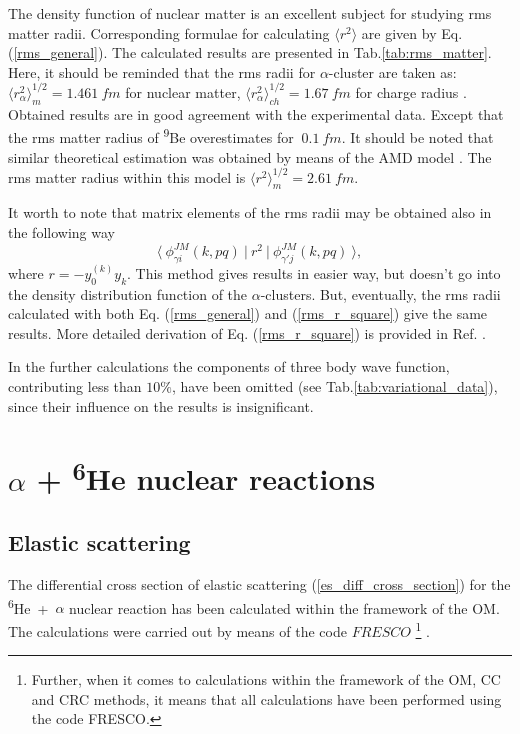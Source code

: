 \documentclass[
12pt, %
oneside, %
english, %
doublespacing, %
doublespacing, %
toctotoc, %
parskip, %
headsepline, %
]{MastersDoctoralThesis} %
\newcommand{\he}{\textsuperscript{6}He\xspace}
\newcommand{\be}{\textsuperscript{9}Be\xspace}
\begin{document}
The density function of nuclear matter is an excellent subject for studying rms matter radii. Corresponding formulae for calculating $\langle r^2 \rangle$ are given by Eq.(\ref{rms_general}).
The calculated results are presented in Tab.\ref{tab:rms_matter}. 
Here, it should be reminded that the rms radii for $\alpha$-cluster are taken as: $\langle r^2_\alpha \rangle^{1/2}_m=1.461~fm$ for nuclear matter, $\langle r^2_\alpha \rangle^{1/2}_{ch}=1.67~fm$ for charge radius \cite{satchler1979folding}.
Obtained results are in good agreement with the experimental data.
Except that the rms matter radius of \be overestimates for $~0.1~fm$. 
It should be noted that similar theoretical estimation was obtained 
by means of the AMD model \cite{hirai2011clustering}. The rms matter radius within this model is $\langle r^2 \rangle^{1/2}_m=2.61~fm$. 

It worth to note that matrix elements of the rms radii may be obtained also in the following way
\begin{equation}
\langle~ \phi_{\gamma i}^{JM}(k,pq) ~\vert~ r^2   ~\vert~ \phi_{\gamma' j}^{JM}(k,pq) ~ \rangle, 
\label{rms_r_square}
\end{equation}
where $r=-y_0^{(k)} { y}_k$. This method gives results in easier way, but doesn't go into the density distribution function of the $\alpha$-clusters.
But, eventually, the rms radii calculated with both Eq. (\ref{rms_general}) and 
(\ref{rms_r_square}) give the same results. More detailed derivation of Eq. (\ref{rms_r_square}) is provided in Ref. \cite{voronchev1982variational}.   

In the further calculations the components of three body wave function, contributing less than $10\%$, have been omitted (see Tab.\ref{tab:variational_data}), since their  influence on the results is insignificant.

\chapter{$\alpha$ + \he nuclear reactions  }
\section{Elastic scattering}

The differential cross section of elastic scattering (\ref{es_diff_cross_section}) for the \he~+~$\alpha$ nuclear reaction has been calculated within the framework of the OM. The calculations were carried out by means of the code $FRESCO$
\footnote{Further, when it comes to calculations within the framework of the OM, CC and CRC methods, it means that all calculations have been performed using the  code FRESCO.} 
 \cite{fresco}.
\end{document}
